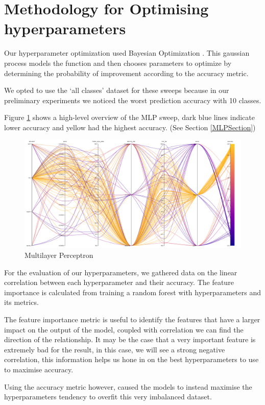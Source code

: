 \documentclass[11pt]{article}
\begin{document}
\newpage
\section{Methodology for Optimising hyperparameters}

Our hyperparameter optimization used Bayesian Optimization \cite{Configuration}. This gaussian process models the function and then chooses parameters to optimize by determining the probability of improvement according to the accuracy metric. 
\par
We opted to use the ‘all classes’ dataset for these sweeps because in our preliminary experiments we noticed the worst prediction accuracy with 10 classes.

Figure \ref{MLPLineGraph} shows a high-level overview of the MLP sweep, dark blue lines indicate lower accuracy and yellow had the highest accuracy. (See Section \ref{MLPSection})

\begin{figure}[h]
  \caption {Multilayer Perceptron} \label{MLPLineGraph}
  \centering 
  \includegraphics[width = \textwidth, height = 0.3\textheight, keepaspectratio]{Images/MLP ParallelCoordGraph.png}
\end{figure}


For the evaluation of our hyperparameters, we gathered data on the linear correlation between each hyperparameter and their accuracy. The feature importance is calculated from training a random forest with hyperparameters and its metrics. \cite{ParameterImportance}
\par
The feature importance metric is useful to identify the features that have a larger impact on the output of the model, coupled with correlation we can find the direction of the relationship. It may be the case that a very important feature is extremely bad for the result, in this case, we will see a strong negative correlation, this information helps us hone in on the best hyperparameters to use to maximise accuracy.
\par
Using the accuracy metric however, caused the models to instead maximise the hyperparameters tendency to overfit this very imbalanced dataset.
\newpage
\end{document}

